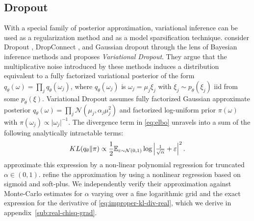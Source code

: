 \documentclass[a4paper,10pt]{article}
\begin{document}
\subsection{Dropout} %
\label{sub:dropout}

With a special family of posterior approximation, variational inference can be used as
a regularization method and as a model sparsification technique. \citet{kingma_variational_2015}
consider Dropout \citep{hinton_improving_2012}, DropConnect \citep{wan_regularization_2013},
and Gaussian dropout \citep{srivastava_dropout_2014,wang_fast_2013} through the lens
of Bayesian inference methods and proposes \textit{Variational Dropout}. They argue that
the multiplicative noise introduced by these methods induces a distribution equivalent to
a fully factorized variational posterior of the form $
  q_\theta(\omega) = \prod_j q_{\theta}(\omega_j)
$, where $q_{\theta}(\omega_j)$ is $\omega_j = \mu_j \xi_j$ with $
  \xi_j \sim p_\theta(\xi_j)
$ iid from some $p_\theta(\xi)$.
%
%
Variational Dropout assumes fully factorized Gaussian approximate posterior $
  q_\theta(\omega)
    = \prod_j \mathcal{N}(\mu_j, \alpha_j \mu_j^2)
$ and factorized log-uniform prior $\pi(\omega)$ with $
  \pi(\omega_j) \propto \lvert \omega_j \rvert^{-1}
$. The divergence term in \eqref{eq:elbo} unravels into a sum of the following
analytically intractable terms:
\begin{equation}  \label{eq:improper-kl-div-real}
  KL(q_\theta \| \pi)
    \propto
      \frac12 \mathbb{E}_{\varepsilon \sim \mathcal{N}(0, 1)}
        \log{\Bigl\lvert \tfrac1{\sqrt{\alpha}} + \varepsilon \Bigr\rvert^2}
  \,.
\end{equation}
\citet{kingma_variational_2015} approximate this expression by a non-linear polynomial
regression for truncated $\alpha \in (0, 1)$. \citet{molchanov_variational_2017}
refine the approximation by using a nonlinear regression based on sigmoid and soft-plus.
We independently verify their approximation against Monte-Carlo estimates for $\alpha$
varying over a fine logarithmic grid and the exact expression for the derivative of
\eqref{eq:improper-kl-div-real}, which we derive in appendix~\ref{sub:real-chisq-grad}.
%
\end{document}
